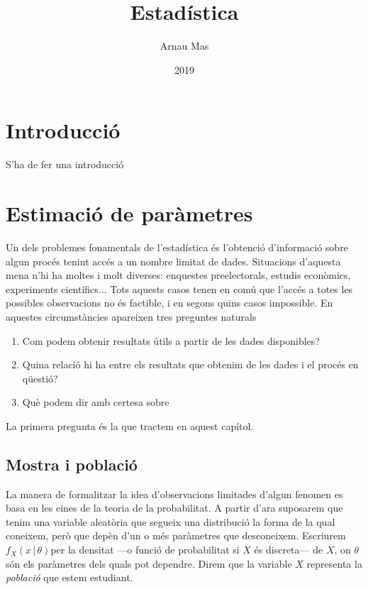 \documentclass[12pt,twoside]{report}
\title{Estadística}
\author{Arnau Mas}
\date{2019}
\numberwithin{table}{section}
\numberwithin{equation}{section}
\numberwithin{figure}{section}
\newcommand{\cond}{\, \vert \,}
\begin{document}
\maketitle

\chapter{Introducció}
S'ha de fer una introducció

\chapter{Estimació de paràmetres}
Un dels problemes fonamentals de l'estadística és l'obtenció d'informació sobre algun procés tenint accés a un nombre limitat de dades. Situacions d'aquesta mena n'hi ha moltes i molt diverses: enquestes preelectorals, estudis econòmics, experiments científics... Tots aquests casos tenen en comú que l'accés a totes les possibles observacions no és factible, i en segons quins casos impossible. En aquestes circumstàncies apareixen tres preguntes naturals
\begin{enumerate}
	\item Com podem obtenir resultats útils a partir de les dades disponibles?
	\item Quina relació hi ha entre els resultats que obtenim de les dades i el procés en qüestió?
	\item Què podem dir amb certesa sobre 
\end{enumerate}
La primera pregunta és la que tractem en aquest capítol. 

\section{Mostra i població}
La manera de formalitzar la idea d'observacions limitades d'algun fenomen es basa en les eines de la teoria de la probabilitat. A partir d'ara suposarem que tenim una variable aleatòria que segueix una distribució la forma de la qual coneixem, però que depèn d'un o més paràmetres que desconeixem. Escriurem \( f_X(x \cond \theta) \)\footnotemark[1] per la densitat ---o funció de probabilitat si \( X \) és discreta--- de \( X \), on \( \theta \) són els paràmetres dels quals pot dependre. Direm que la variable \( X \) representa la \emph{població} que estem estudiant. 

\end{document}
